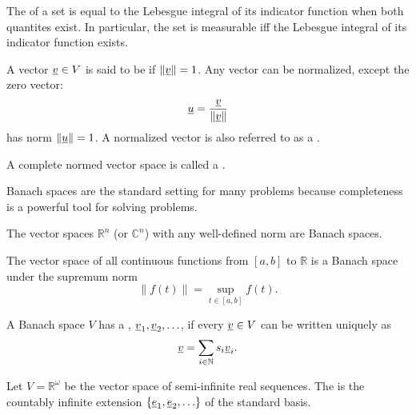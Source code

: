 {\begin{minipage}[t]{\textwidth}
\begin{definition}
The  of a set is equal to the Lebesgue integral of its indicator function when both quantites exist. In particular, the set is measurable iff the Lebesgue integral of its indicator function exists.
\end{definition}

\end{minipage}}

\newpage

\begin{definition}
A vector $\underline{v} \in V$ is said to be  if $\left\| \underline{v} \right\| = 1$.
Any vector can be normalized, except the zero vector:
\begin{equation}
\underline{u} = \frac{\underline{v}}{\left\| \underline{v} \right\|}
\end{equation}
has norm $\left\| \underline{u} \right\| = 1$.
A normalized vector is also referred to as a .
\end{definition}

\begin{definition}
A complete normed vector space is called a .
\end{definition}

Banach spaces are the standard setting for many problems because completeness is a powerful tool for solving problems.

\begin{example}
The vector spaces $\mathbb{R}^n$ (or $\mathbb{C}^n$) with any well-defined norm are Banach spaces.
\end{example}

\begin{example}
The vector space of all continuous functions from $[a,b]$ to $\mathbb{R}$ is a Banach space under the supremum norm
\[ \left\| f(t) \right\| = \sup_{t\in [a,b]} f(t). \]
\end{example}

\begin{definition}
A Banach space $V$ has a , $\underline{v}_1, \underline{v}_2, \ldots$, if every $\underline{v} \in V$ can be written uniquely as
\[ \underline{v} = \sum_{i\in \mathbb{N}} s_i \underline{v}_i. \]
\end{definition}

\begin{example}
Let $V = \mathbb{R}^\omega$ be the vector space of semi-infinite real sequences.
The  is the countably infinite extension $\{\underline{e}_1 ,\underline{e}_2, \ldots \}$ of the standard basis.
\end{example}

